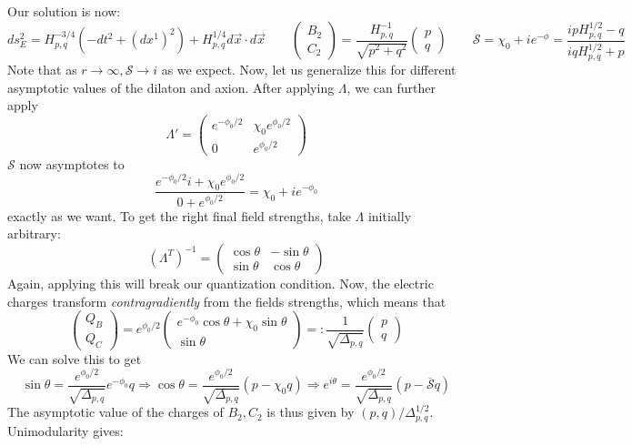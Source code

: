 \documentclass[11pt, class=article, crop=false]{standalone}
\begin{document}
\begin{enumerate}
	Our solution is now:
	\[
		ds^2_E = H_{p,q}^{-3/4} (-dt^2 + (dx^1)^2) + H_{p,q}^{1/4} d\vec x \cdot d \vec x \qquad \begin{pmatrix}
			B_2\\ C_2
		\end{pmatrix} = \frac{H_{p,q}^{-1}}{\sqrt{p^2 + q^2}} \begin{pmatrix}
			p\\q
		\end{pmatrix}\qquad \mathcal S = \chi_0 + i e^{- \phi} = \frac{i p H_{p,q}^{1/2} - q}{i q H_{p,q}^{1/2} + p}
	\]
	Note that as $r \to \infty, \mathcal S \to i$ as we expect. 
	Now, let us generalize this for different asymptotic values of the dilaton and axion. After applying $\Lambda$, we can further apply
	\[
		\Lambda' = \begin{pmatrix}
			e^{-\phi_0 / 2} & \chi_0 e^{\phi_0/2}\\
			0 & e^{\phi_0/2}
		\end{pmatrix}
	\]
	$\mathcal S$ now asymptotes to
	\[
		\frac{e^{-\phi_0/2} i + \chi_0 e^{\phi_0/2}}{0 + e^{\phi_0/2}} = \chi_0 + i e^{-\phi_0}
	\]
	exactly as we want. To get the right final field strengths, take $\Lambda$ initially arbitrary:
	\[
		(\Lambda^T)^{-1} = \begin{pmatrix}
			\cos \theta & -\sin \theta\\
			\sin \theta & \cos \theta
		\end{pmatrix}
	\]
	Again, applying this will break our quantization condition. Now, the electric charges transform \emph{contragradiently} from the fields strengths, which means that
	\[
		\begin{pmatrix}
			Q_B\\
			Q_C
		\end{pmatrix}
		= e^{\phi_0/2} \begin{pmatrix}
			e^{-\phi_0} \cos \theta + \chi_0 \sin \theta\\
			\sin \theta
		\end{pmatrix}  =: \frac{1}{\sqrt{\Delta_{p,q}}} \begin{pmatrix}
			p\\q
		\end{pmatrix}
	\]
	We can solve this to get 
	\[
		\sin \theta = \frac{e^{\phi_0/2}}{\sqrt{\Delta_{p,q}}} e^{-\phi_0} q \Rightarrow \cos \theta = \frac{e^{\phi_0/2}}{\sqrt{\Delta_{p,q}}} (p - \chi_0 q) \Rightarrow e^{i \theta} = \frac{e^{\phi_0/2}}{\sqrt{\Delta_{p,q}}} (p - \overline{\mathcal S} q )
	\]
	The asymptotic value of the charges of $B_2, C_2$ is thus given by $(p, q)/\Delta^{1/2}_{p,q}$. Unimodularity gives:

\end{enumerate}
\end{document}
